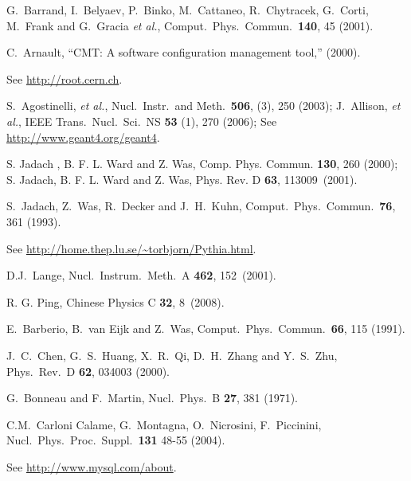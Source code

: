 \begin{thebibliography}{99}
  G.~Barrand, I.~Belyaev, P.~Binko, M.~Cattaneo, R.~Chytracek, G.~Corti, M.~Frank and G.~Gracia {\it et al.},
  Comput.\ Phys.\ Commun.\  {\bf 140}, 45 (2001).

  C.~Arnault, ``CMT: A software configuration management tool,'' (2000).

  See \url{http://root.cern.ch}.

  S.~Agostinelli, {\it et al.}, Nucl.\ Instr.\ and Meth.\ {\bf 506}, (3), 250 (2003);
  J.~Allison, {\it et al.}, IEEE Trans.\ Nucl.\ Sci.\ NS {\bf 53} (1), 270 (2006);
  See \url{http://www.geant4.org/geant4}.

 S. Jadach , B. F. L. Ward and Z. Was,
  Comp. Phys. Commun. {\bf 130}, 260 (2000); S. Jadach, B. F. L. Ward
  and  Z. Was, Phys. Rev. D {\bf 63}, 113009~(2001).

  S.~Jadach, Z.~Was, R.~Decker and J.~H.~Kuhn,
  Comput.\ Phys.\ Commun.\  {\bf 76}, 361 (1993).

  See \url{http://home.thep.lu.se/\~torbjorn/Pythia.html}.

  D.J.~Lange,
  Nucl.\ Instrum.\ Meth.\ A {\bf 462},
  152~(2001).

  R. G. Ping, Chinese Physics C {\bf 32}, 8~(2008).

  E.~Barberio, B.~van Eijk and Z.~Was,
  Comput.\ Phys.\ Commun.\  {\bf 66}, 115 (1991).

  J.~C.~Chen, G.~S.~Huang, X.~R.~Qi, D.~H.~Zhang and Y.~S.~Zhu,
  Phys.\ Rev.\ D {\bf 62}, 034003 (2000).

  G.~Bonneau and F.~Martin,
  Nucl.\ Phys.\ B {\bf 27}, 381 (1971).

  C.M.~Carloni Calame, G.~Montagna, O.~Nicrosini, F.~Piccinini,
  Nucl.\ Phys.\ Proc.\ Suppl.\ {\bf 131} 48-55 (2004).

  See \url{http://www.mysql.com/about}.


\end{thebibliography}
